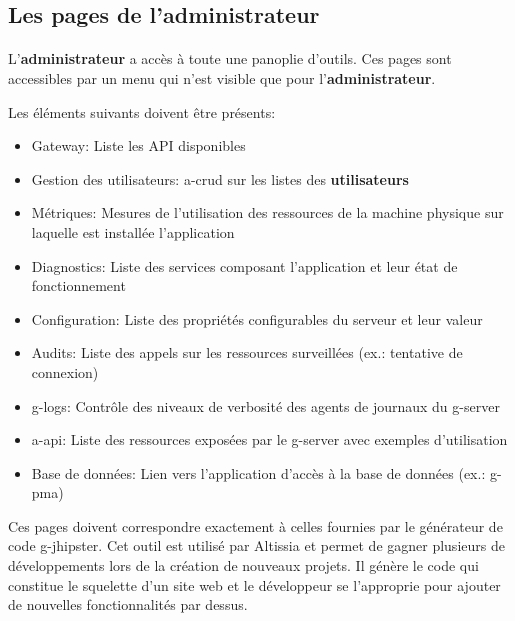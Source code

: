 \subsection{Les pages de l'administrateur}
\label{subsec:admin-pages}

\paragraph{}
L'\textbf{administrateur} a accès à toute une panoplie d'outils.
Ces pages sont accessibles par un menu qui n'est visible que pour l'\textbf{administrateur}.

Les éléments suivants doivent être présents:
\begin{itemize}
    \item Gateway: Liste les API disponibles
    \item Gestion des utilisateurs: \acrshort{a-crud} sur les listes des \textbf{utilisateurs}
    \item Métriques: Mesures de l'utilisation des ressources de la machine physique sur laquelle est installée l'application
    \item Diagnostics: Liste des services composant l'application et leur état de fonctionnement
    \item Configuration: Liste des propriétés configurables du serveur et leur valeur
    \item Audits: Liste des appels sur les ressources surveillées (ex.: tentative de connexion)
    \item \Glspl{g-log}: Contrôle des niveaux de verbosité des agents de journaux du \gls{g-server}
    \item \gls{a-api}: Liste des ressources exposées par le \gls{g-server} avec exemples d'utilisation
    \item Base de données: Lien vers l'application d'accès à la base de données (ex.: \gls{g-pma})
\end{itemize}

Ces pages doivent correspondre exactement à celles fournies par le générateur de code \Gls{g-jhipster}.
Cet outil est utilisé par Altissia et permet de gagner plusieurs de développements lors de la création de nouveaux projets.
Il génère le code qui constitue le squelette d'un site web et le développeur se l'approprie pour ajouter de nouvelles fonctionnalités par dessus.
